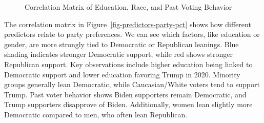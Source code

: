 \documentclass[
  letterpaper,
  DIV=11,
  numbers=noendperiod]{scrartcl}
\begin{document}
\begin{figure}


\caption{\label{fig-predictors-education-race-voting}Correlation Matrix
of Education, Race, and Past Voting Behavior}

\end{figure}%

The correlation matrix in Figure~\ref{fig-predictors-party-pct} shows
how different predictors relate to party preferences. We can see which
factors, like education or gender, are more strongly tied to Democratic
or Republican leanings. Blue shading indicates stronger Democratic
support, while red shows stronger Republican support. Key observations
include higher education being linked to Democratic support and lower
education favoring Trump in 2020. Minority groups generally lean
Democratic, while Caucasian/White voters tend to support Trump. Past
voter behavior shows Biden supporters remain Democratic, and Trump
supporters disapprove of Biden. Additionally, women lean slightly more
Democratic compared to men, who often lean Republican.
\end{document}
